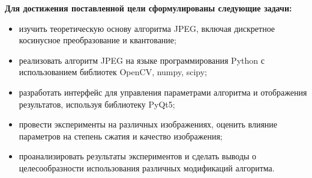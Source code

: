 \textbf{Для достижения поставленной цели сформулированы следующие задачи:}

\begin{itemize}[label=--]
    \item изучить теоретическую основу алгоритма JPEG, включая дискретное косинусное преобразование и квантование;
    \item реализовать алгоритм JPEG на языке программирования Python с использованием библиотек OpenCV, numpy, scipy;
    \item разработать интерфейс для управления параметрами алгоритма и отображения результатов, используя библиотеку PyQt5;
    \item провести эксперименты на различных изображениях, оценить влияние параметров на степень сжатия и качество изображения;
    \item проанализировать результаты экспериментов и сделать выводы о целесообразности использования различных модификаций алгоритма.
\end{itemize}
